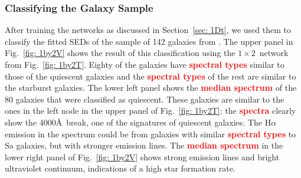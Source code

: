         \subsubsection{Classifying the Galaxy Sample}
         \label{sec: 1Dv}
            After training the networks as discussed in Section~\ref{sec: 1Dt}, we used them to classify the fitted SEDs of the sample of 142 galaxies from .
            The upper panel in Fig.~\ref{fig: 1by2V} shows the result of this classification using the $1\times2$~network from Fig.~\ref{fig: 1by2T}.
            Eighty of the galaxies have \textbf{\textcolor{red}{spectral types}} similar to those of the quiescent galaxies and the \textbf{\textcolor{red}{spectral types}} of the rest are similar to the starburst galaxies.
            The lower left panel shows the \textbf{\textcolor{red}{median spectrum}} of the 80 galaxies that were classified as quiescent. 
            These galaxies are similar to the ones in the left node in the upper panel of Fig.~\ref{fig: 1by2T}:
            the \textbf{\textcolor{red}{spectra}} clearly show the 4000\AA~break, one of the signatures of quiescent galaxies.
            The H$\alpha$ emission in the spectrum could be from galaxies with similar \textbf{\textcolor{red}{spectral types}} to Sa galaxies, but with stronger emission lines.
            The \textbf{\textcolor{red}{median spectrum}} in the lower right panel of Fig.~\ref{fig: 1by2V} shows strong emission lines and bright ultraviolet continuum, indications of a high star formation rate.
